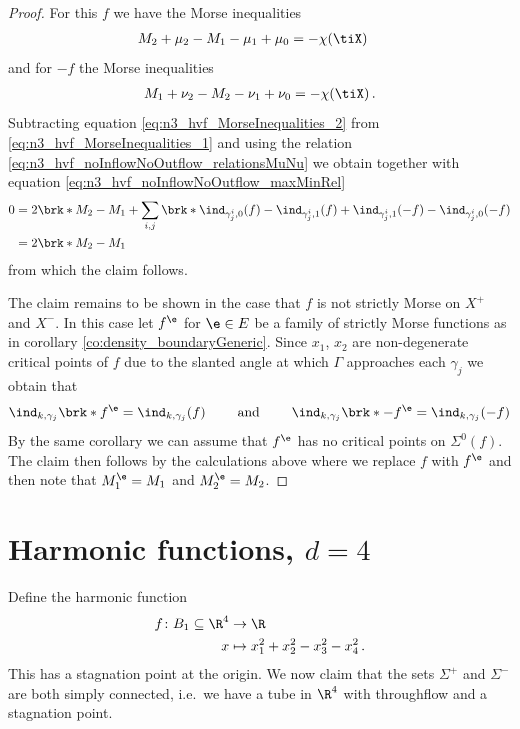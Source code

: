 \begin{proof}
  For this $f$ we have the Morse inequalities
  \begin{align}
    M_2+\mu_2-M_1-\mu_1+\mu_0&=-\chi(\tiX) \label{eq:n3_hvf_MorseInequalities_1}
  \end{align}
  and for $-f$ the Morse inequalities
  \begin{align}
    M_1+\nu_2-M_2-\nu_1+\nu_0=-\chi(\tiX) \label{eq:n3_hvf_MorseInequalities_2}\,.
  \end{align}
  Subtracting equation \eqref{eq:n3_hvf_MorseInequalities_2} from \eqref{eq:n3_hvf_MorseInequalities_1} and using the relation
  \eqref{eq:n3_hvf_noInflowNoOutflow_relationsMuNu} we obtain
  together with equation \eqref{eq:n3_hvf_noInflowNoOutflow_maxMinRel}
  \begin{align*}
    0&=2\brk*{M_2-M_1}
    +\sum_{i,j}\brk*{\ind_{\gamma_j^i,0}(f)
    -\ind_{\gamma_j^i,1}(f)
    +\ind_{\gamma_j^i,1}(-f)
    -\ind_{\gamma_j^i,0}(-f)} \\
    &=2\brk*{M_2-M_1}
  \end{align*}
  from which the claim follows.

  The claim remains to be shown in the case that $f$ is not strictly Morse on $X^+$ and $X^-$. In this case let
  $f^\e$ for $\e\in E$ be a family of strictly Morse functions as in corollary \ref{co:density_boundaryGeneric}.
  Since $x_1$, $x_2$ are non-degenerate critical points of $f$
  due to the slanted angle at which
  $\Gamma$ approaches each $\gamma_j$
  we obtain that
  \begin{align}
    \ind_{k,\gamma_j}\brk*{f^\e}=\ind_{k,\gamma_j}(f)\qquad\text{ and }\qquad 
    \ind_{k,\gamma_j}\brk*{-f^\e}=\ind_{k,\gamma_j}(-f)
    \label{eq:n3_hvf_noInflowNoOutflow_morse_indexApprox}
  \end{align}
  By the same corollary we can assume that $f^\e$ has no critical points on
  $\Sigma^0(f)$.
  The claim then follows by the calculations above where we replace
  $f$ with $f^\e$ and then note that $M_1^\e=M_1$ and $M_2^\e=M_2$.
\end{proof}

\chapter{Harmonic functions, $d=4$} 
Define the harmonic function 
\begin{align*}
  f\colon B_1\subseteq\R^4&\to \R \\
  x &\mapsto x_1^2+x_2^2-x_3^2-x_4^2\,.
\end{align*}
This has a stagnation point at the origin. We now claim that the sets $\Sigma^+$ and $\Sigma^-$ are both simply connected, i.e.\
we have a tube in $\R^4$ with throughflow and a stagnation point.

